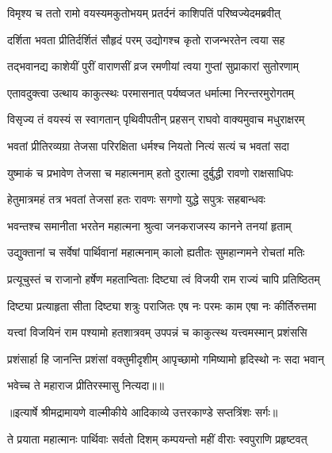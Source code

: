 
\twolineshloka
{विमृश्य च ततो रामो वयस्यमकुतोभयम्}
{प्रतर्दनं काशिपतिं परिष्वज्येदमब्रवीत्} %

\twolineshloka
{दर्शिता भवता प्रीतिर्दर्शितं सौहृदं परम्}
{उद्योगश्च कृतो राजन्भरतेन त्वया सह} %

\twolineshloka
{तद्भवानद्य काशेयीं पुरीं वाराणसीं व्रज}
{रमणीयां त्वया गुप्तां सुप्राकारां सुतोरणाम्} %

\twolineshloka
{एतावदुक्त्वा उत्थाय काकुत्स्थः परमासनात्}
{पर्यष्वजत धर्मात्मा निरन्तरमुरोगतम्} %

\twolineshloka
{विसृज्य तं वयस्यं स स्वागतान् पृथिवीपतीन्}
{प्रहसन् राघवो वाक्यमुवाच मधुराक्षरम्} %

\twolineshloka
{भवतां प्रीतिरव्यग्रा तेजसा परिरक्षिता}
{धर्मश्च नियतो नित्यं सत्यं च भवतां सदा} %

\twolineshloka
{युष्माकं च प्रभावेण तेजसा च महात्मनाम्}
{हतो दुरात्मा दुर्बुद्धी रावणो राक्षसाधिपः} %

\twolineshloka
{हेतुमात्रमहं तत्र भवतां तेजसां हतः}
{रावणः सगणो युद्धे सपुत्रः सहबान्धवः} %

\twolineshloka
{भवन्तश्च समानीता भरतेन महात्मना}
{श्रुत्वा जनकराजस्य कानने तनयां हृताम्} %

\twolineshloka
{उद्युक्तानां च सर्वेषां पार्थिवानां महात्मनाम्}
{कालो ह्यतीतः सुमहान्गमने रोचतां मतिः} %

\twolineshloka
{प्रत्यूचुस्तं च राजानो हर्षेण महतान्विताः}
{दिष्ट्या त्वं विजयी राम राज्यं चापि प्रतिष्ठितम्} %

\twolineshloka
{दिष्ट्या प्रत्याहृता सीता दिष्ट्या शत्रुः पराजितः}
{एष नः परमः काम एषा नः कीर्तिरुत्तमा} %

\twolineshloka
{यत्त्वां विजयिनं राम पश्यामो हतशात्रवम्}
{उपपन्नं च काकुत्स्थ यत्त्वमस्मान् प्रशंससि} %

\twolineshloka
{प्रशंसार्हा हि जानन्ति प्रशंसां वक्तुमीदृशीम्}
{आपृच्छामो गमिष्यामो हृदिस्थो नः सदा भवान्} %

{भवेच्च ते महाराज प्रीतिरस्मासु नित्यदा॥॥} %

\addtocounter{shlokacount}{1}


{॥इत्यार्षे श्रीमद्रामायणे वाल्मीकीये आदिकाव्ये उत्तरकाण्डे सप्तत्रिंशः सर्गः॥}


\twolineshloka
{ते प्रयाता महात्मानः पार्थिवाः सर्वतो दिशम्}
{कम्पयन्तो महीं वीराः स्वपुराणि प्रहृष्टवत्} %

